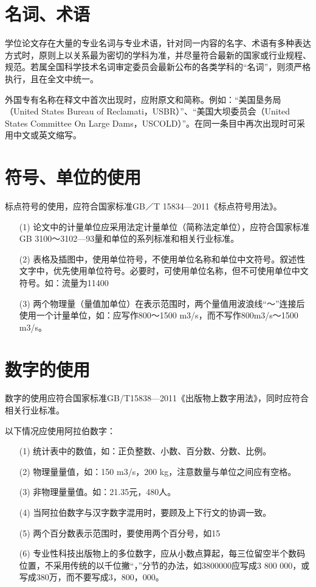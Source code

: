 \section{名词、术语}

学位论文存在大量的专业名词与专业术语，针对同一内容的名字、术语有多种表达方式时，原则上以关系最为密切的学科为准，并尽量符合最新的国家或行业规程、规范。若属全国科学技术名词审定委员会最新公布的各类学科的“名词”，则须严格执行，且在全文中统一。

外国专有名称在释文中首次出现时，应附原文和简称。例如：“美国垦务局（United States Bureau of Reclamati，USBR）”、“美国大坝委员会（United States Committee On Large Dams，USCOLD）”。在同一条目中再次出现时可采用中文或英文缩写。


\section{符号、单位的使用}
标点符号的使用，应符合国家标准GB／T 15834—2011《标点符号用法》。
\begin{enumerate}
    \item[(1)] 论文中的计量单位应采用法定计量单位（简称法定单位），应符合国家标准GB 3100～3102—93量和单位的系列标准和相关行业标准。
    \item[(2)] 表格及插图中，使用单位符号，不使用单位名称和单位中文符号。叙述性文字中，优先使用单位符号。必要时，可使用单位名称，但不可使用单位中文符号。如：流量为11400
    \item[(3)] 两个物理量（量值加单位）在表示范围时，两个量值用波浪线“～”连接后使用一个计量单位，如：应写作800～1500 m3/s，而不写作800m3/s～1500 m3/s。
\end{enumerate}


\section{数字的使用}

数字的使用应符合国家标准GB/T15838—2011《出版物上数字用法》，同时应符合相关行业标准。

以下情况应使用阿拉伯数字：
\begin{enumerate}
    \item[(1)] 统计表中的数值，如：正负整数、小数、百分数、分数、比例。
    \item[(2)] 物理量量值，如：150 m3/s，200 kg，注意数量与单位之间应有空格。
    \item[(3)] 非物理量量值。如：21.35元，480人。
    \item[(4)] 当阿拉伯数字与汉字数字混用时，要顾及上下行文的协调一致。
    \item[(5)] 两个百分数表示范围时，要使用两个百分号，如15%
    \item[(6)] 专业性科技出版物上的多位数字，应从小数点算起，每三位留空半个数码位置，不采用传统的以千位撇“，”分节的办法，如3800000应写成3 800 000，或写成380万，而不要写成3，800，000。
\end{enumerate}

